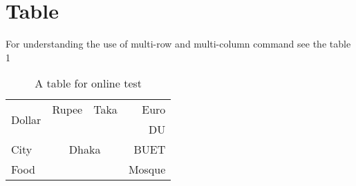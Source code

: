 \documentclass{article}
\begin{document}
\section{Table}
For understanding the use of multi-row and multi-column command see the
table 1

\begin{table}[h]
    \centering
    \begin{tabular}{|l|c|c|r|}
        \hline
        \multirow{2}{*}{Dollar}  & Rupee & Taka & Euro \\
        \cline{2-4}
        & \multicolumn{2}{c|}{} & DU \\
        \cline{4-4}
        City & \multicolumn{2}{c}{Dhaka} & BUET \\
        \cline{1-1}
        \cline{4-4}
        Food & \multicolumn{2}{c|}{} & Mosque\\
        \hline
    \end{tabular}
    \caption{A table for online test}
    \label{tab:my_label}
\end{table}
\end{document}
